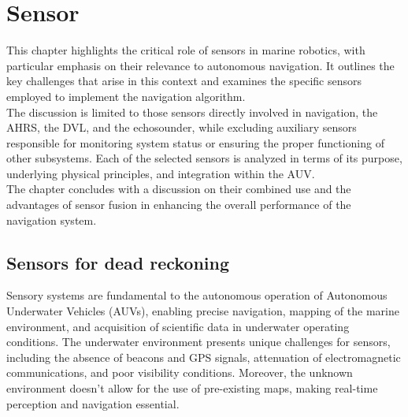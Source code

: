 \chapter{Sensor}
\label{chap:third}
\ifpdf
    \graphicspath{{Chapter3/Figures/PNG/}{Chapter3/Figures/PDF/}{Chapter3/Figures/}{Chapter3/Figures/EPS/}}
\else
    \graphicspath{{Chapter3/Figures/EPS/}{Chapter3/Figures/}}
\fi

This chapter highlights the critical role of sensors in marine robotics, with particular emphasis on their relevance to autonomous 
navigation. It outlines the key challenges that arise in this context and examines the specific sensors employed to implement the 
navigation algorithm.\\
The discussion is limited to those sensors directly involved in navigation, the AHRS, the DVL, and the echosounder, 
while excluding auxiliary sensors responsible for monitoring system status or ensuring the proper functioning of other subsystems. 
Each of the selected sensors is analyzed in terms of its purpose, underlying physical principles, and integration within the AUV.\\ 
The chapter concludes with a discussion on their combined use and the advantages of sensor fusion in enhancing the overall 
performance of the navigation system.

\section{Sensors for dead reckoning}
Sensory systems are fundamental to the autonomous operation of Autonomous Underwater Vehicles (AUVs), enabling precise navigation, 
mapping of the marine environment, and acquisition of scientific data in underwater operating conditions. The underwater 
environment presents unique challenges for sensors, including the absence of beacons and GPS signals, attenuation of electromagnetic 
communications, and poor visibility conditions. Moreover, the unknown environment doesn't allow for the use of pre-existing maps, 
making real-time perception and navigation essential.

